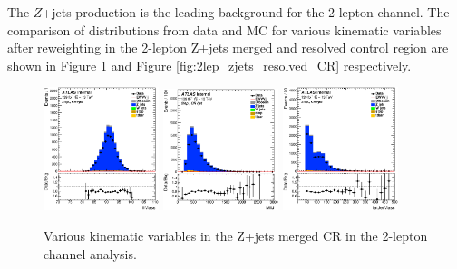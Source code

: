 The $Z$+jets production is the leading background for the 2-lepton channel. The comparison of distributions from data and MC for various kinematic variables after reweighting in the 2-lepton Z+jets merged and resolved control region are shown in Figure \ref{fig:2lep_zjets_merged_CR} and Figure \ref{fig:2lep_zjets_resolved_CR}
respectively. 

\begin{figure}[ht]
 \centering
   \includegraphics[width=0.30\textwidth]{figures/2lep/reweighting/after_reweighting/C_0ptag1pfat0pjet_0ptv_CRVjet_llMass_Lin.eps}
   \includegraphics[width=0.30\textwidth]{figures/2lep/reweighting/after_reweighting/C_0ptag1pfat0pjet_0ptv_CRVjet_MllJ_Lin.eps}
   \includegraphics[width=0.30\textwidth]{figures/2lep/reweighting/after_reweighting/C_0ptag1pfat0pjet_0ptv_CRVjet_fatJetMass_Lin.eps}
    \caption{ Various kinematic variables in the Z+jets merged CR in the 2-lepton channel analysis.}
    \label{fig:2lep_zjets_merged_CR}
\end{figure}



